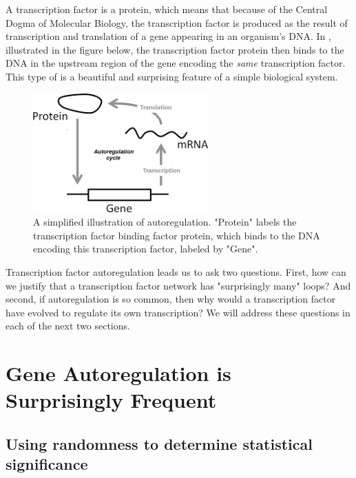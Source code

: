 A transcription factor is a protein, which means that because of the Central Dogma of Molecular Biology, the transcription factor is produced as the result of transcription and translation of a gene appearing in an organism's DNA. In , illustrated in the figure below, the transcription factor protein then binds to the DNA in the upstream region of the gene encoding the \textit{same} transcription factor. This type of  is a beautiful and surprising feature of a simple biological system.

\begin{figure}[h]
\centering
\mySfFamily
\includegraphics[width = 0.6\textwidth]{../assets/images/600px/autoregulation_example.png}
\caption{A simplified illustration of autoregulation. "Protein" labels the transcription factor binding factor protein, which binds to the DNA encoding this transcription factor, labeled by "Gene".}
\label{fig:autoregulation_example}
\end{figure}

Transcription factor autoregulation leads us to ask two questions. First, how can we justify that a transcription factor network has "surprisingly many" loops? And second, if autoregulation is so common, then why would a transcription factor have evolved to regulate its own transcription? We will address these questions in each of the next two sections.


\FloatBarrier
{}

\section{Gene Autoregulation is Surprisingly Frequent}
\label{sec:gene_autoregulation_is_surprisingly_frequent}

\subsection{Using randomness to determine statistical significance}

